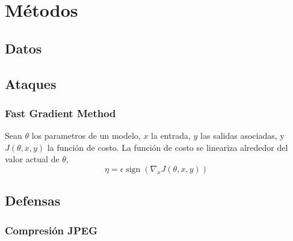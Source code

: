 \section{Métodos}
\subsection{Datos}
\subsection{Ataques}
\subsubsection{Fast Gradient Method\cite{goodfellow2015explaining, maybe more}}

Sean $\theta$ los parametros de un modelo, $x$ la entrada, $y$ las salidas asociadas, y $J(\theta, x, y)$ la función de costo. La función de costo se lineariza alrededor del valor actual de $\theta$,
\[\eta = \epsilon \operatorname{sign}(\nabla_x J(\theta, x, y))\]
\subsection{Defensas}
\subsubsection{Compresión JPEG}
